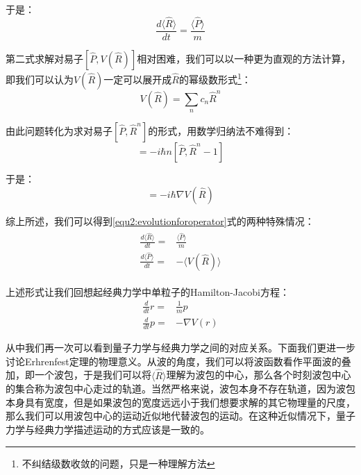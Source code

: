     于是：
    \begin{equation}
         \frac{d\langle \hat{R}\rangle}{dt}=\frac{\langle\hat{P}\rangle}{m}
    \end{equation}
   
   第二式求解对易子$[\hat{P},V(\hat{R})]$相对困难，我们可以以一种更为直观的方法计算，即我们可以认为$V(\hat{R})$一定可以展开成$\hat{R}$的幂级数形式\footnote{不纠结级数收敛的问题，只是一种理解方法}：
   \begin{equation}
       V(\hat{R})=\sum_n c_n \hat{R}^n
   \end{equation}
   
   由此问题转化为求对易子$[\hat{P},\hat{R}^n]$的形式，用数学归纳法不难得到：
   \begin{equation}
       [\hat{P},\hat{R}^n]=-i\hbar n[\hat{P},\hat{R}^n-1]
   \end{equation}
   
   于是：
   \begin{equation}
       [\hat{P},V(\hat{R})]=-i\hbar \nabla V(\hat{R})
   \end{equation}
   
   综上所述，我们可以得到\eqref{equ2:evolutionforoperator}式的两种特殊情况：
   \begin{align}\label{equ2:Erhrenfest}
       \begin{split}
           \frac{d\langle \hat{R}\rangle}{dt}=&\frac{\langle\hat{P}\rangle}{m}\\
           \frac{d\langle \hat{P}\rangle}{dt}=&-\langle V(\hat{R})\rangle
       \end{split}
   \end{align}
   
   上述形式让我们回想起经典力学中单粒子的Hamilton-Jacobi方程：
   \begin{align}
       \frac{d}{dt}r=&\frac{1}{m}p\\
       \frac{d}{dt}p=&-\nabla V(r)
   \end{align}
   
   从中我们再一次可以看到量子力学与经典力学之间的对应关系。下面我们更进一步讨论Erhrenfest定理的物理意义。从波的角度，我们可以将波函数看作平面波的叠加，即一个波包，于是我们可以将$\langle\hat{R}\rangle$理解为波包的中心，那么各个时刻波包中心的集合称为波包中心走过的轨道。当然严格来说，波包本身不存在轨道，因为波包本身具有宽度，但是如果波包的宽度远远小于我们想要求解的其它物理量的尺度，那么我们可以用波包中心的运动近似地代替波包的运动。在这种近似情况下，量子力学与经典力学描述运动的方式应该是一致的。
   
